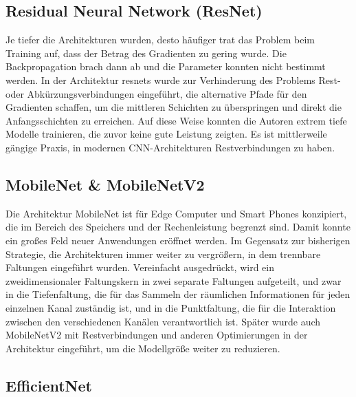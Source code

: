 \subsection{Residual Neural Network (ResNet)}

Je tiefer die Architekturen wurden, desto häufiger trat das Problem beim Training auf, dass der Betrag des Gradienten zu gering wurde. Die Backpropagation brach dann ab und die Parameter konnten nicht bestimmt werden. In der Architektur \ac{resnets} wurde zur Verhinderung des Problems Rest- oder Abkürzungsverbindungen eingeführt, die alternative Pfade für den Gradienten schaffen, um die mittleren Schichten zu überspringen und direkt die Anfangsschichten zu erreichen. Auf diese Weise konnten die Autoren extrem tiefe Modelle trainieren, die zuvor keine gute Leistung zeigten. Es ist mittlerweile gängige Praxis, in modernen CNN-Architekturen Restverbindungen zu haben. \cite{He:2016}




\subsection{MobileNet \& MobileNetV2} %

Die Architektur MobileNet ist für Edge Computer und Smart Phones konzipiert, die im Bereich des Speichers und der Rechenleistung begrenzt sind. Damit konnte ein großes Feld neuer Anwendungen eröffnet werden. Im Gegensatz zur bisherigen Strategie, die Architekturen immer weiter zu vergrößern, in dem trennbare Faltungen eingeführt wurden. Vereinfacht ausgedrückt, wird ein zweidimensionaler Faltungskern in zwei separate Faltungen aufgeteilt, und zwar in die Tiefenfaltung, die für das Sammeln der räumlichen Informationen für jeden einzelnen Kanal zuständig ist, und in die Punktfaltung, die für die Interaktion zwischen den verschiedenen Kanälen verantwortlich ist. Später wurde auch MobileNetV2 mit Restverbindungen und anderen Optimierungen in der Architektur eingeführt, um die Modellgröße weiter zu reduzieren. \cite{Howard:2017,MobileNet:2018}

\subsection{EfficientNet} %

